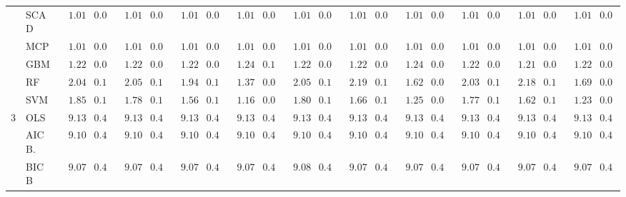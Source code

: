 \begin{tabular}{llllllllllllllllllllll}
	& SCAD  & $\phantom{0}1.01$ & $0.04$ & $\phantom{0}1.01$ & $0.04$ & $\phantom{0}1.01$ & $0.04$ & $\phantom{0}1.01$ & $0.04$ & $\phantom{0}1.01$ & $0.04$ & $\phantom{0}1.01$ & $0.04$ & $\phantom{0}1.01$ & $0.04$ & $\phantom{0}1.01$ & $0.04$ & $\phantom{0}1.01$ & $0.04$ & $\phantom{0}1.01$ & $0.04$ \\
	& MCP  & $\phantom{0}1.01$ & $0.05$ & $\phantom{0}1.01$ & $0.04$ & $\phantom{0}1.01$ & $0.04$ & $\phantom{0}1.01$ & $0.05$ & $\phantom{0}1.01$ & $0.04$ & $\phantom{0}1.01$ & $0.04$ & $\phantom{0}1.01$ & $0.04$ & $\phantom{0}1.01$ & $0.04$ & $\phantom{0}1.01$ & $0.04$ & $\phantom{0}1.01$ & $0.05$ \\
	& GBM  & $\phantom{0}1.22$ & $0.07$ & $\phantom{0}1.22$ & $0.06$ & $\phantom{0}1.22$ & $0.06$ & $\phantom{0}1.24$ & $0.10$ & $\phantom{0}1.22$ & $0.06$ & $\phantom{0}1.22$ & $0.06$ & $\phantom{0}1.24$ & $0.08$ & $\phantom{0}1.22$ & $0.06$ & $\phantom{0}1.21$ & $0.06$ & $\phantom{0}1.22$ & $0.07$ \\
	& RF  & $\phantom{0}2.04$ & $0.15$ & $\phantom{0}2.05$ & $0.15$ & $\phantom{0}1.94$ & $0.12$ & $\phantom{0}1.37$ & $0.06$ & $\phantom{0}2.05$ & $0.16$ & $\phantom{0}2.19$ & $0.14$ & $\phantom{0}1.62$ & $0.08$ & $\phantom{0}2.03$ & $0.13$ & $\phantom{0}2.18$ & $0.12$ & $\phantom{0}1.69$ & $0.08$ \\
	& SVM  & $\phantom{0}1.85$ & $0.14$ & $\phantom{0}1.78$ & $0.12$ & $\phantom{0}1.56$ & $0.11$ & $\phantom{0}1.16$ & $0.08$ & $\phantom{0}1.80$ & $0.12$ & $\phantom{0}1.66$ & $0.12$ & $\phantom{0}1.25$ & $0.09$ & $\phantom{0}1.77$ & $0.12$ & $\phantom{0}1.62$ & $0.10$ & $\phantom{0}1.23$ & $0.08$ \\
	3 & OLS  & $\phantom{0}9.13$ & $0.40$ & $\phantom{0}9.13$ & $0.40$ & $\phantom{0}9.13$ & $0.40$ & $\phantom{0}9.13$ & $0.40$ & $\phantom{0}9.13$ & $0.40$ & $\phantom{0}9.13$ & $0.40$ & $\phantom{0}9.13$ & $0.40$ & $\phantom{0}9.13$ & $0.40$ & $\phantom{0}9.13$ & $0.40$ & $\phantom{0}9.13$ & $0.40$ \\
	& AIC B.  & $\phantom{0}9.10$ & $0.40$ & $\phantom{0}9.10$ & $0.40$ & $\phantom{0}9.10$ & $0.40$ & $\phantom{0}9.10$ & $0.40$ & $\phantom{0}9.10$ & $0.40$ & $\phantom{0}9.10$ & $0.40$ & $\phantom{0}9.10$ & $0.40$ & $\phantom{0}9.10$ & $0.40$ & $\phantom{0}9.10$ & $0.40$ & $\phantom{0}9.10$ & $0.40$ \\
	& BIC B  & $\phantom{0}9.07$ & $0.40$ & $\phantom{0}9.07$ & $0.40$ & $\phantom{0}9.07$ & $0.40$ & $\phantom{0}9.07$ & $0.40$ & $\phantom{0}9.08$ & $0.40$ & $\phantom{0}9.07$ & $0.40$ & $\phantom{0}9.07$ & $0.40$ & $\phantom{0}9.07$ & $0.40$ & $\phantom{0}9.07$ & $0.40$ & $\phantom{0}9.07$ & $0.40$ \\

\end{tabular}
